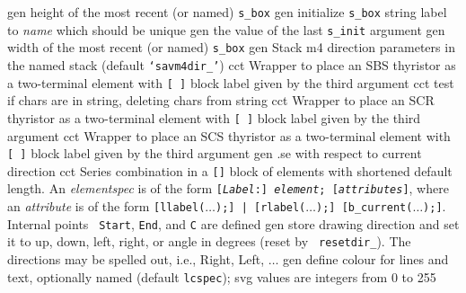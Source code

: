   {gen}
  {height of the most recent (or named) {\tt s\_box}
    }
  {gen}
  {initialize {\tt s\_box} string label to {\sl name} which should
  be unique
    }
  {gen}
  {the value of the last {\tt s\_init} argument
    }
  {gen}
  {width of the most recent (or named) {\tt s\_box}
    }
  {gen}
  {Stack m4 direction parameters in the named stack
    (default {\tt `savm4dir\_'})}
  {cct}
  {Wrapper to place an SBS thyristor as a two-terminal element with
   {\tt [ ]} block label given by the third argument
    }
  {cct}
  {test if chars are in string, deleting chars from string}
  {cct}
  {Wrapper to place an SCR thyristor as a two-terminal element with
   {\tt [ ]} block label given by the third argument
    }
  {cct}
  {Wrapper to place an SCS thyristor as a two-terminal element with
   {\tt [ ]} block label given by the third argument
    }
  {gen}
  {.se with respect to current direction}
  {cct}
  { Series combination in a {\tt []} block of elements
    with shortened default length.  An {\sl elementspec} is of the
    form {\tt [{\sl Label}:] {\sl element}; [{\sl attributes}]},
    where an {\sl attribute} is of the form {\tt [llabel($\ldots$);] |
    [rlabel($\ldots$);] [b\_current($\ldots$);]}.  Internal points {\tt
    Start}, {\tt End}, and {\tt C} are defined
    }
  {gen}
  {store drawing direction and set it to
    up, down, left, right, or angle in degrees (reset by {\tt
    resetdir\_}).  The directions may be spelled out, i.e., Right,
    Left, $\ldots$
   }
  {gen}
  {define colour for lines and text, optionally named (default
  {\tt lcspec});
   svg values are integers from 0 to 255}

